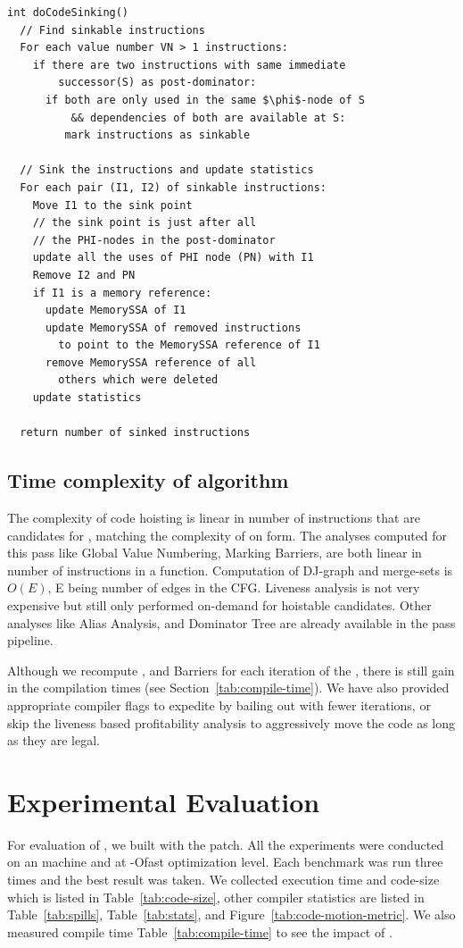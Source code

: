 \documentclass[sigplan,10pt,review,anonymous]{acmart}\settopmatter{printfolios=true,printccs=false,printacmref=false}
\begin{document}
\begin{verbatim}
int doCodeSinking()
  // Find sinkable instructions
  For each value number VN > 1 instructions:
    if there are two instructions with same immediate
        successor(S) as post-dominator:
      if both are only used in the same $\phi$-node of S
          && dependencies of both are available at S:
         mark instructions as sinkable

  // Sink the instructions and update statistics
  For each pair (I1, I2) of sinkable instructions:
    Move I1 to the sink point
    // the sink point is just after all
    // the PHI-nodes in the post-dominator
    update all the uses of PHI node (PN) with I1
    Remove I2 and PN
    if I1 is a memory reference:
      update MemorySSA of I1
      update MemorySSA of removed instructions
        to point to the MemorySSA reference of I1
      remove MemorySSA reference of all
        others which were deleted
    update statistics

  return number of sinked instructions
\end{verbatim}


\subsection{Time complexity of algorithm}
The complexity of code hoisting is linear in number of instructions that are
candidates for \gcm{}, matching the complexity of \PRE{} on \SSA{} form.  The
analyses computed for this pass like Global Value Numbering, Marking Barriers,
are both linear in number of instructions in a function. Computation of DJ-graph
and merge-sets is $O(E)$, E being number of edges in the CFG. Liveness analysis
is not very expensive \cite{das2012} but still only performed on-demand for
hoistable candidates. Other analyses like Alias Analysis, \MemorySSA{} and
Dominator Tree are already available in the \LLVM{} pass pipeline.

Although we recompute \GVN{}, and Barriers for each iteration of the \gcm{},
there is still gain in the compilation times (see
Section~\ref{tab:compile-time}). We have also provided appropriate compiler
flags to expedite \gcm{} by bailing out with fewer iterations, or skip the
liveness based profitability analysis to aggressively move the code as long as
they are legal.

\section{Experimental Evaluation}
\label{sec:experimental-results}
For evaluation of \gcm{}, we built \SPEC{} with the patch. All the experiments
were conducted on an \xlinux{} machine and at -Ofast optimization level. Each
benchmark was run three times and the best result was taken. We collected
execution time and code-size which is listed in Table~\ref{tab:code-size}, other
compiler statistics are listed in Table~\ref{tab:spills}, Table~\ref{tab:stats}, and
Figure~\ref{tab:code-motion-metric}.  We also measured compile time
Table~\ref{tab:compile-time} to see the impact of \gcm{}.
\end{document}
